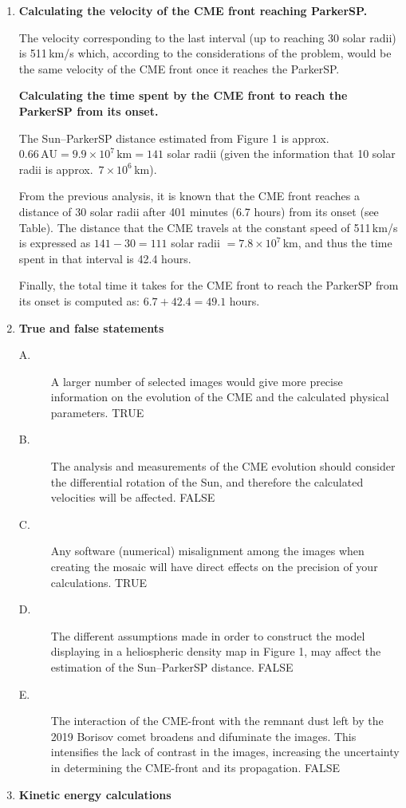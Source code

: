 \begin{enumerate}
\item \textbf{Calculating the velocity of the CME front reaching ParkerSP.}

  The velocity corresponding to the last interval (up to reaching 30 solar
  radii) is 511\,km/s which, according to the considerations of the problem,
  would be the same velocity of the CME front once it reaches the ParkerSP.

  \textbf{Calculating the time spent by the CME front to reach the ParkerSP
  from its onset.}

  The Sun--ParkerSP distance estimated from Figure 1 is approx.\
  $0.66\,\mathrm{AU} = 9.9\times10^{7}\,\mathrm{km} = 141$ solar radii (given
  the information that 10 solar radii is approx.\ $7\times10^{6}$\,km).

  From the previous analysis, it is known that the CME front reaches a
  distance of 30 solar radii after 401 minutes (6.7 hours) from its onset
  (see Table). The distance that the CME travels at the constant speed of
  511\,km/s is expressed as $141-30=111$ solar radii
  $= 7.8\times 10^{7}$\,km, and thus the time spent in that interval is
  42.4 hours.

  Finally, the total time it takes for the CME front to reach the ParkerSP
  from its onset is computed as: $6.7 + 42.4 = 49.1$ hours.
\item \textbf{True and false statements}
  \begin{description}
  \item[A.] A larger number of selected images would give more precise
    information on the evolution of the CME and the calculated physical
    parameters. TRUE
  \item[B.] The analysis and measurements of the CME evolution should
    consider the differential rotation of the Sun, and therefore the
    calculated velocities will be affected. FALSE
  \item[C.] Any software (numerical) misalignment among the images when
    creating the mosaic will have direct effects on the precision of your
    calculations. TRUE
  \item[D.] The different assumptions made in order to construct the model
    displaying in a heliospheric density map in Figure 1, may affect the
    estimation of the Sun--ParkerSP distance. FALSE
  \item[E.] The interaction of the CME-front with the remnant dust left by
    the 2019 Borisov comet broadens and difuminate the images. This
    intensifies the lack of contrast in the images, increasing the
    uncertainty in determining the CME-front and its propagation. FALSE
  \end{description}
\item \textbf{Kinetic energy calculations}


\end{enumerate}
